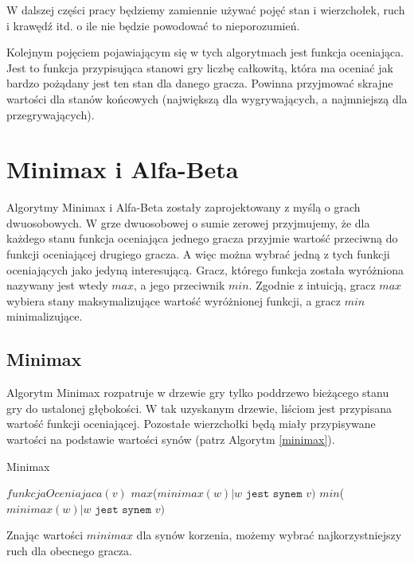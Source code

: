 \documentclass{pracamgr}
\begin{document}
W dalszej części pracy będziemy zamiennie używać pojęć stan i wierzchołek, ruch i krawędź itd. o ile nie będzie powodować to nieporozumień.

Kolejnym pojęciem pojawiającym się w tych algorytmach jest funkcja oceniająca.
Jest to funkcja przypisująca stanowi gry liczbę całkowitą, która ma oceniać jak bardzo pożądany jest ten stan dla danego gracza.
Powinna przyjmować skrajne wartości dla stanów końcowych (największą dla wygrywających, a najmniejszą dla przegrywających).

\section{Minimax i Alfa-Beta}

Algorytmy Minimax i Alfa-Beta zostały zaprojektowany z myślą o grach dwuosobowych.
W grze dwuosobowej o sumie zerowej przyjmujemy, że dla każdego stanu funkcja oceniająca jednego gracza przyjmie wartość przeciwną do funkcji oceniającej drugiego gracza.
A więc można wybrać jedną z tych funkcji oceniających jako jedyną interesującą.
Gracz, którego funkcja została wyróżniona nazywany jest wtedy \(max\), a jego przeciwnik \(min\).
Zgodnie z intuicją, gracz \(max\) wybiera stany maksymalizujące wartość wyróżnionej funkcji, a gracz \(min\) minimalizujące.

\subsection{Minimax}

Algorytm Minimax rozpatruje w drzewie gry tylko poddrzewo bieżącego stanu gry do ustalonej głębokości. W tak uzyskanym drzewie, liściom jest przypisana wartość funkcji oceniającej.
Pozostałe wierzchołki będą miały przypisywane wartości na podstawie wartości synów (patrz Algorytm \ref{minimax}).

\begin{algorytm}
\caption{Minimax\label{minimax}}
\begin{algorithmic}[1]
	\State \Return $funkcjaOceniajaca(v)$
\EndIf
{}
    \State \Return $max$($minimax(w) | \texttt{\(w\) jest synem \(v\)})$
\Else
    \State \Return $min$($minimax(w) | \texttt{\(w\) jest synem \(v\)})$
\EndIf
\EndFunction
\end{algorithmic}
\end{algorytm}

Znając wartości \(minimax\) dla synów korzenia, możemy wybrać najkorzystniejszy ruch dla obecnego gracza.
\end{document}
